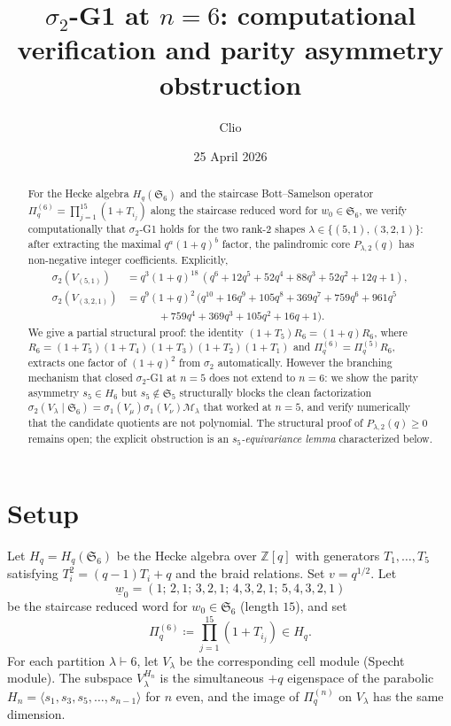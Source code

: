 \documentclass[11pt]{article}
\title{$\sigma_2$-G1 at $n = 6$: computational verification and parity asymmetry obstruction}
\author{Clio}
\date{25 April 2026}
\theoremstyle{plain}
\theoremstyle{definition}
\theoremstyle{remark}
\newcommand{\Z}{\mathbb{Z}}
\newcommand{\Sym}{\mathfrak{S}}
\newcommand{\Hq}{H_q}
\newcommand{\Pibs}{\Pi_q}
\begin{document}
\maketitle

\begin{abstract}
For the Hecke algebra $\Hq(\Sym_6)$ and the staircase Bott--Samelson operator
$\Pibs^{(6)} = \prod_{j=1}^{15}(1 + T_{i_j})$ along the staircase reduced word
for $w_0 \in \Sym_6$, we verify computationally that $\sigma_2$-G1 holds for
the two rank-2 shapes $\lambda \in \{(5,1), (3,2,1)\}$: after extracting the
maximal $q^a(1+q)^b$ factor, the palindromic core $P_{\lambda,2}(q)$ has
non-negative integer coefficients. Explicitly,
\begin{align*}
\sigma_2(V_{(5,1)}) &= q^3 (1+q)^{18}\,(q^6 + 12q^5 + 52q^4 + 88q^3 + 52q^2 + 12q + 1), \\
\sigma_2(V_{(3,2,1)}) &= q^9 (1+q)^2\,(q^{10} + 16q^9 + 105q^8 + 369q^7 + 759q^6 + 961q^5\\
&\qquad\quad + 759q^4 + 369q^3 + 105q^2 + 16q + 1).
\end{align*}
We give a partial structural proof: the identity $(1+T_5) R_6 = (1+q) R_6$,
where $R_6 = (1+T_5)(1+T_4)(1+T_3)(1+T_2)(1+T_1)$ and $\Pibs^{(6)} = \Pibs^{(5)} R_6$,
extracts one factor of $(1+q)^2$ from $\sigma_2$ automatically. However the
branching mechanism that closed $\sigma_2$-G1 at $n = 5$ does not extend to
$n = 6$: we show the parity asymmetry $s_5 \in H_6$ but $s_5 \notin \Sym_5$
structurally blocks the clean factorization
$\sigma_2(V_\lambda \mid \Sym_6) = \sigma_1(V_\mu) \sigma_1(V_\nu) \mathcal{M}_\lambda$
that worked at $n=5$, and verify numerically that the candidate quotients
are not polynomial. The structural proof of $P_{\lambda,2}(q) \geq 0$
remains open; the explicit obstruction is an \emph{$s_5$-equivariance lemma}
characterized below.
\end{abstract}

\section{Setup}

Let $\Hq = \Hq(\Sym_6)$ be the Hecke algebra over $\Z[q]$ with generators
$T_1,\ldots,T_5$ satisfying $T_i^2 = (q-1)T_i + q$ and the braid relations.
Set $v = q^{1/2}$. Let
\[ \underline{w}_0 = (1;\, 2,1;\, 3,2,1;\, 4,3,2,1;\, 5,4,3,2,1) \]
be the staircase reduced word for $w_0 \in \Sym_6$ (length $15$), and set
\[ \Pibs^{(6)} \coloneqq \prod_{j=1}^{15} (1 + T_{i_j}) \in \Hq. \]
For each partition $\lambda \vdash 6$, let $V_\lambda$ be the corresponding
cell module (Specht module). The subspace $V_\lambda^{H_n}$ is the
simultaneous $+q$ eigenspace of the parabolic
$H_n = \langle s_1, s_3, s_5, \ldots, s_{n-1}\rangle$ for $n$ even, and the
image of $\Pibs^{(n)}$ on $V_\lambda$ has the same dimension.
\end{document}
